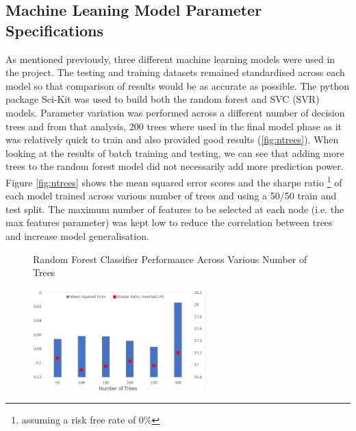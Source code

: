 \documentclass[11pt]{article}
\begin{document}
\subsection{Machine Leaning Model Parameter Specifications}
As mentioned previously, three different machine learning models were used in the project.  The testing and training datasets remained standardised across each model so that comparison of results would be as accurate as possible. The python package Sci-Kit was used to build both the random forest and SVC (SVR) models. Parameter variation was performed across a different number of decision trees and from that analysis, 200 trees where used in the final model phase as it was relatively quick to train and also provided good results (\ref{fig:ntrees}). When looking at the results of batch training and testing, we can see that adding more trees to the random forest model did not necessarily add more prediction power. Figure \ref{fig:ntrees} shows the mean squared error scores and the sharpe ratio \footnote{assuming a risk free rate of 0\%} of each model trained across various number of trees and using a 50/50 train and test split. The maximum number of features to be selected at each node (i.e. the max features parameter) was kept low to reduce the correlation between trees and increase model generalisation.

\begin{figure}[h]
    \centering
	\caption{Random Forest Classifier Performance Across Various Number of Trees}    
	\includegraphics[width=0.6\textwidth]{NtreesMSE}
    \label{fig:NtreesMSE}
     \caption*{}
\end{figure}
\end{document}
